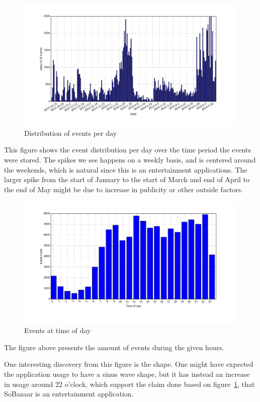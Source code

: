     \begin{figure}[H]
        \includegraphics[width=5in]{image/eventsPerDay.png}
        \centering
        \caption{Distribution of events per day}
    \label{figure:eventOnDaysDist}
    \end{figure}
        This figure shows the event distribution per day over the time period the events were stored.
        The spikes we see happens on a weekly basis, and is centered around the weekends, which is natural since this is an entertainment applications.
        The larger spike from the start of January to the start of March and end of April to the end of May might be due to increase in publicity or other outside factors.

   \begin{figure}[H]
        \includegraphics[width=5in]{image/hrdistribution.png}
        \centering
        \caption{Events at time of day}
    \label{figure:timeOfDayDistr}
    \end{figure}
        The figure above presents the amount of events during the given hours.

        One interesting discovery from this figure is the shape. One might have expected the application usage to have a sinus wave shape, but it has instead an increase in usage around 22 o'clock, which support the claim done based on figure~\ref{figure:eventOnDaysDist}, that SoBazaar is an entertainment application.

